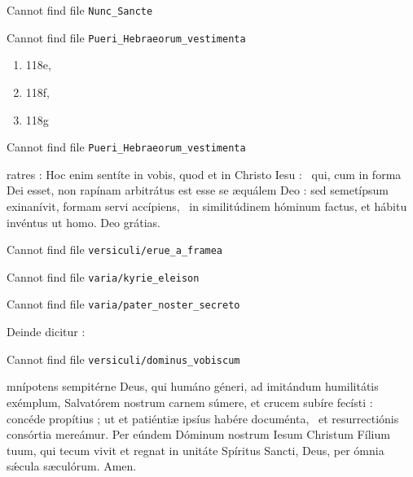 



Cannot find file \verb|Nunc_Sancte|


Cannot find file \verb|Pueri_Hebraeorum_vestimenta|
\begin{enumerate}
\item 118e,\item 118f,\item 118g
\end{enumerate}
Cannot find file \verb|Pueri_Hebraeorum_vestimenta|
    


\begin{lectio}ratres : Hoc enim sentíte in vobis, quod et in Christo Iesu :~ qui, cum in forma Dei esset, non rapínam arbitrátus est esse se æquálem Deo :
sed semetípsum exinanívit, formam servi accípiens,~
in similitúdinem hóminum factus, et hábitu invéntus ut homo.
\R Deo grátias.\end{lectio}

Cannot find file \verb|versiculi/erue_a_framea|

Cannot find file \verb|varia/kyrie_eleison|

Cannot find file \verb|varia/pater_noster_secreto|

\begin{rubric}Deinde dicitur :\end{rubric}

Cannot find file \verb|versiculi/dominus_vobiscum|


\begin{lectio}mnípotens sempitérne Deus, qui humáno géneri, ad imitándum humilitátis exémplum, Salvatórem nostrum carnem súmere,
et crucem subíre fecísti :~ concéde propítius ; ut et patiéntiæ ipsíus habére documénta,~
et resurrectiónis consórtia mereámur.
Per eúndem Dóminum nostrum Iesum Christum Fílium tuum,
qui tecum vivit et regnat in unitáte Spíritus Sancti, Deus, per ómnia sǽcula sæculórum.
\R Amen.\end{lectio}

